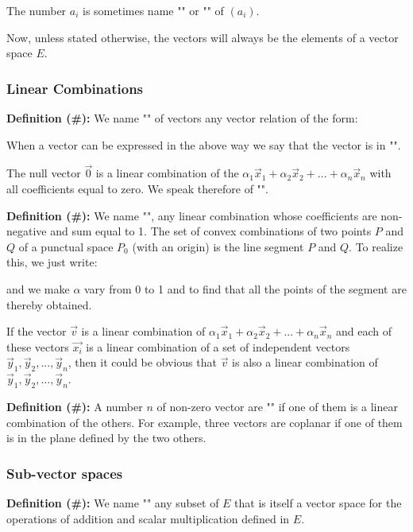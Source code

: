 	The number $a_i$ is sometimes name "" or "" of $(a_i)$.

Now, unless stated otherwise, the vectors will always be the elements of a vector space $E$.

	\subsubsection{Linear Combinations}\label{linear combinations}
	\textbf{Definition (\#\mydef):} We name "\label{vector linear combination}" of vectors any vector relation of the form:
	
When a vector can be expressed in the above way we say that the vector is in "".

	The null vector $\vec{0}$ is a linear combination of the $\alpha_1\vec{x}_1+\alpha_2\vec{x}_2+...+\alpha_n\vec{x}_n$ with all coefficients equal to zero. We speak therefore of "".

	\textbf{Definition (\#\mydef):} We name "", any linear combination whose coefficients are non-negative and sum equal to 1. The set of convex combinations of two points $P$ and $Q$ of a punctual space $P_0$ (with an origin) is the line segment $P$ and $Q$. To realize this, we just write:
	
	and we make $\alpha$ vary from 0 to 1 and to find that all the points of the segment are thereby obtained.
	
	If the vector $\vec{v}$ is a linear combination of $\alpha_1\vec{x}_1+\alpha_2\vec{x}_2+...+\alpha_n\vec{x}_n$ and each of these vectors $\vec{x_i}$ is a linear combination of a set of independent vectors $\vec{y}_1,\vec{y}_2,...,\vec{y}_n$, then it could be obvious that $\vec{v}$ is also a linear combination of  $\vec{y}_1,\vec{y}_2,...,\vec{y}_n$.
	
	\textbf{Definition (\#\mydef):} A number $n$ of non-zero vector are "" if one of them is a linear combination of the others. For example, three vectors are coplanar if one of them is in the plane defined by the two others.
	
	\subsubsection{Sub-vector spaces}
	\textbf{Definition (\#\mydef):} We name "" any subset of $E$ that is itself a vector space for the operations of addition and scalar multiplication defined in $E$.
	
